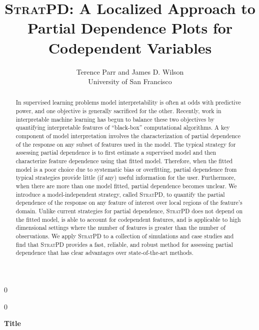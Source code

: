 \documentclass[12pt]{article}
\newcommand{\blind}{0}
\newcommand{\spd}{\fontfamily{cmr}\textsc{\small StratPD}}
\begin{document}
\def\spacingset#1{\renewcommand{\baselinestretch}%
{#1}\small\normalsize} \spacingset{1}



\blind
{
  \title{{\textsc{StratPD}}: \bf A Localized Approach to Partial Dependence Plots for Codependent Variables}

  \author{Terence Parr and James D. Wilson\\
      University of San Francisco\\
}
  \maketitle
} \fi

\blind
{
  \bigskip
  \bigskip
  \bigskip
  \begin{center}
    {\LARGE\bf Title}
\end{center}
  \medskip
} \fi

\bigskip
\begin{abstract}
In supervised learning problems model interpretability is often at odds with predictive power, and one objective is generally sacrificed for the other. Recently, work in interpretable machine learning has begun to balance these two objectives by quantifying interpretable features of ``black-box'' computational algorithms. A key component of model interpretation involves the characterization of partial dependence of the response on any subset of features used in the model. The typical strategy for assessing partial dependence is to first estimate a supervised model and then characterize feature dependence using that fitted model. Therefore, when the fitted model is a poor choice due to systematic bias or overfitting, partial dependence from typical strategies provide little (if any) useful information for the user. Furthermore, when there are more than one model fitted, partial dependence becomes unclear. We introduce a model-independent strategy, called \spd{}, to quantify the partial dependence of the response on any feature of interest over local regions of the feature's domain. Unlike current strategies for partial dependence, \spd{} does not depend on the fitted model, is able to account for codependent features, and is applicable to high dimensional settings where the number of features is greater than the number of observations. We apply \spd{} to a collection of simulations and case studies and find that \spd{} provides a fast, reliable, and robust method for assessing partial dependence that has clear advantages over state-of-the-art methods. 
\end{abstract}
\end{document}
